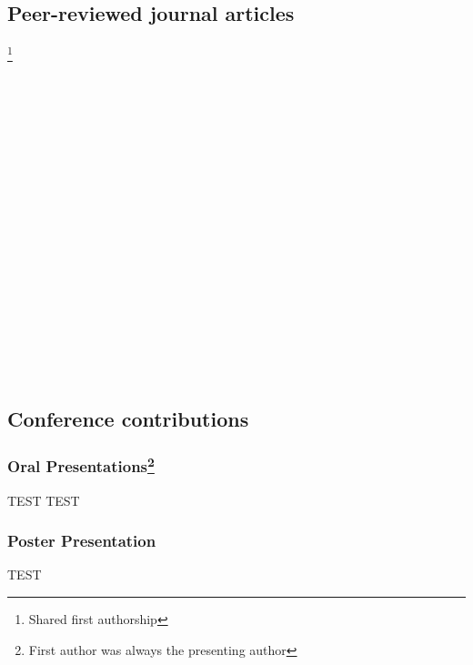 \subsection*{Peer-reviewed journal articles}
\footnote{Shared first authorship}\\
\\
\\
\\
\\
\\
\\
\\
\\
\\
\\
\\
\\
\\
\\
\\
\\
\\
\\

\subsection*{Conference contributions}
\subsubsection*{Oral Presentations\footnote{First author was always the presenting author}}
TEST 
TEST
\subsubsection*{Poster Presentation\footnotemark[2]}
TEST